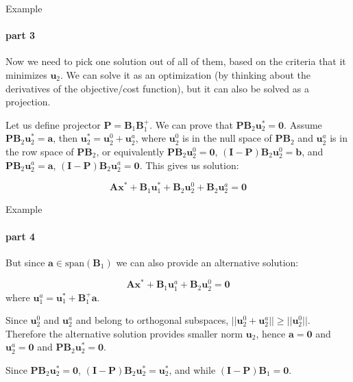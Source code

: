 \documentclass{beamer}
\begin{document}
\begin{frame}{Example}
\framesubtitle{part 3}
\begin{flushleft}

Now we need to pick one solution out of all of them, based on the criteria that it minimizes $\mathbf{u}_2$. We can solve it as an optimization (by thinking about the derivatives of the objective/cost function), but it can also be solved as a projection.

\bigskip

Let us define projector $\mathbf{P} = \mathbf{B}_1 \mathbf{B}^+_1$. We can prove that $\mathbf{P} \mathbf{B}_2 \mathbf{u}^*_2 = \mathbf{0}$. Assume $\mathbf{P} \mathbf{B}_2 \mathbf{u}^*_2 = \mathbf{a}$, then $\mathbf{u}^*_2 =  \mathbf{u}^0_2 + \mathbf{u}^a_2$, where $\mathbf{u}^0_2$ is in the null space of $\mathbf{P} \mathbf{B}_2$ and $\mathbf{u}^a_2$ is in the row space of $\mathbf{P} \mathbf{B}_2$, or equivalently $\mathbf{P} \mathbf{B}_2 \mathbf{u}^0_2 = \mathbf{0}$, $(\mathbf{I} - \mathbf{P}) \mathbf{B}_2 \mathbf{u}^0_2 = \mathbf{b}$, and $\mathbf{P} \mathbf{B}_2 \mathbf{u}^a_2 = \mathbf{a}$, $(\mathbf{I} - \mathbf{P}) \mathbf{B}_2 \mathbf{u}^a_2 = \mathbf{0}$. This gives us solution:

\begin{equation}
    \mathbf{A} \mathbf{x}^* + \mathbf{B}_1 \mathbf{u}^*_1 + \mathbf{B}_2 \mathbf{u}^0_2 + \mathbf{B}_2 \mathbf{u}^a_2 = \mathbf{0}
\end{equation}

\end{flushleft}
\end{frame}


\begin{frame}{Example}
\framesubtitle{part 4}
\begin{flushleft}

But since $\mathbf{a} \in \text{span}(\mathbf{B}_1)$ we can also provide an alternative solution:

\begin{equation}
    \mathbf{A} \mathbf{x}^* + \mathbf{B}_1 \mathbf{u}^a_1 + \mathbf{B}_2 \mathbf{u}^0_2 = \mathbf{0}
\end{equation}
%
where $\mathbf{u}^a_1 = \mathbf{u}^*_1 + \mathbf{B}^+_1 \mathbf{a}$.

\bigskip

Since $\mathbf{u}^0_2$ and $\mathbf{u}^a_2$ and belong to orthogonal subspaces, $||\mathbf{u}^0_2 + \mathbf{u}^a_2|| \geq ||\mathbf{u}^0_2||$. Therefore the alternative solution provides smaller norm $\mathbf{u}_2$, hence $\mathbf{a} = \mathbf{0}$ and $\mathbf{u}^a_2 = \mathbf{0}$ and $\mathbf{P} \mathbf{B}_2 \mathbf{u}^*_2 = \mathbf{0}$.

\bigskip

Since $\mathbf{P} \mathbf{B}_2 \mathbf{u}^*_2 = \mathbf{0}$, $(\mathbf{I} - \mathbf{P}) \mathbf{B}_2 \mathbf{u}^*_2 = \mathbf{u}^*_2$, and while $(\mathbf{I} - \mathbf{P}) \mathbf{B}_1 = \mathbf{0}$.


\end{flushleft}
\end{frame}
\end{document}
